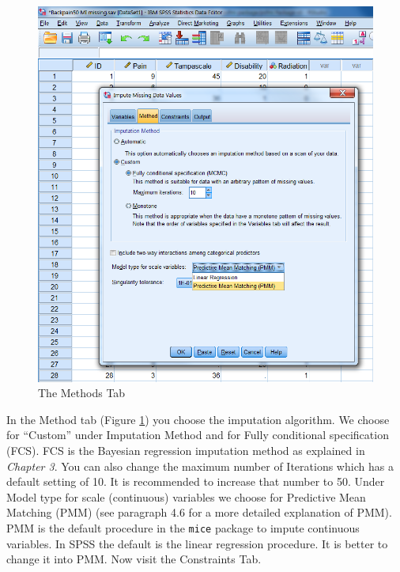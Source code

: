 \documentclass[]{book}
\begin{document}
\begin{figure}

{\centering \includegraphics[width=0.9\linewidth]{images/fig4.7} 

}

\caption{The Methods Tab}\label{fig:fig4-7}
\end{figure}

In the Method tab (Figure \ref{fig:fig4-7}) you choose the imputation
algorithm. We choose for ``Custom'' under Imputation Method and for
Fully conditional specification (FCS). FCS is the Bayesian regression
imputation method as explained in \emph{Chapter 3}. You can also change
the maximum number of Iterations which has a default setting of 10. It
is recommended to increase that number to 50. Under Model type for scale
(continuous) variables we choose for Predictive Mean Matching (PMM) (see
paragraph 4.6 for a more detailed explanation of PMM). PMM is the
default procedure in the \texttt{mice} package to impute continuous
variables. In SPSS the default is the linear regression procedure. It is
better to change it into PMM. Now visit the Constraints Tab.
\end{document}
